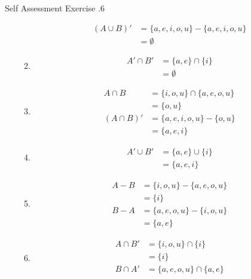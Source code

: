 \documentclass[../notes.tex]{subfiles}
\begin{document}
\begin{exercisebox}{Self Assessment Exercise \thechapter.6}
\begin{enumerate}
\begin{enumerate}[label=(\alph*)]
\begin{align*}
                  (A \cup B)' &= \{a, e, i, o, u\} - \{a, e, i, o, u\}\\
                  &= \emptyset
                \end{align*}
              \item \rule{0pt}{11pt} \vspace*{-25pt}
                \begin{align*}
                  A' \cap B' &= \{a, e\} \cap \{i\}\\
                  &= \emptyset
                \end{align*}
              \item \rule{0pt}{11pt} \vspace*{-25pt}
                \begin{align*}
                  A \cap B &= \{i, o, u\} \cap \{a, e, o, u\}\\
                  &= \{o, u\}\\
                  (A \cap B)' &= \{a, e, i, o, u\} - \{o, u\}\\
                  &= \{a, e, i\}
                \end{align*}
              \item \rule{0pt}{11pt} \vspace*{-25pt}
                \begin{align*}
                  A' \cup B' &= \{a, e\} \cup \{i\}\\
                  &= \{a, e, i\}
                \end{align*}
              \item \rule{0pt}{11pt} \vspace*{-25pt}
                \begin{align*}
                  A - B &= \{i, o, u\} - \{a, e, o, u\}\\
                  &= \{i\}\\
                  B - A &= \{a, e, o, u\} - \{i, o, u\}\\
                  &= \{a,e\}
                \end{align*}
              \item \rule{0pt}{11pt} \vspace*{-25pt}
                \begin{align*}
                  A \cap B' &= \{i, o, u\} \cap \{i\}\\
                  &= \{i\}\\
                  B \cap A' &= \{a, e, o, u\} \cap \{a, e\}\\

\end{align*}
\end{enumerate}
\end{enumerate}
\end{exercisebox}
\end{document}
